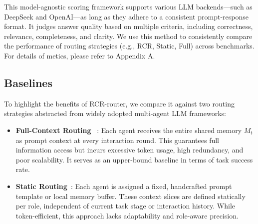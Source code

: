\documentclass[letterpaper]{article} %
\begin{document}
This model-agnostic scoring framework supports various LLM backends—such as DeepSeek and OpenAI—as long as they adhere to a consistent prompt-response format. It judges answer quality based on multiple criteria, including correctness, relevance, completeness, and clarity. We use this method to consistently compare the performance of routing strategies (e.g., RCR, Static, Full) across benchmarks.
For details of metics, please refer to  Appendix A.%

\subsection{Baselines}

To highlight the benefits of RCR-router, we compare it against two routing strategies abstracted from widely adopted multi-agent LLM frameworks: 

\begin{itemize}
    \item \textbf{Full-Context Routing} ~\cite{crewai2024,wu2023autogen,hong2023metagpt}: Each agent receives the entire shared memory $M_t$ as prompt context at every interaction round. This guarantees full information access but incurs excessive token usage, high redundancy, and poor scalability. It serves as an upper-bound baseline in terms of task success rate.
    
    \item \textbf{Static Routing}~\cite{langgraph2025,gao2024agentscope,ye2025x}: Each agent is assigned a fixed, handcrafted prompt template or local memory buffer. These context slices are defined statically per role, independent of current task stage or interaction history. While token-efficient, this approach lacks adaptability and role-aware precision.
\end{itemize}
\end{document}
